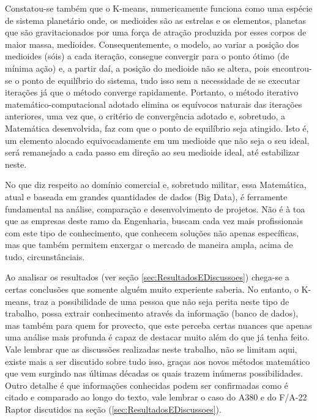 \documentclass[12pt]{article} %
\begin{document}
	Constatou-se também que o K-means, numericamente funciona como uma espécie de sistema planetário onde, os medioides são as estrelas e os elementos, planetas que são gravitacionados por uma força de atração produzida por esses corpos de maior massa, medioides. Consequentemente, o modelo, ao variar a posição dos medioides (sóis) a cada iteração, consegue convergir para o ponto ótimo (de mínima ação) e, a partir daí, a posição do medioide não se altera, pois encontrou-se o ponto de equilíbrio do sistema, tudo isso sem a necessidade de se executar  iterações já que o método converge rapidamente. Portanto, o método iterativo matemático-computacional adotado elimina os equívocos naturais das iterações anteriores, uma vez que, o critério de convergência adotado e, sobretudo, a Matemática desenvolvida, faz com que o ponto de equilíbrio seja atingido. Isto é, um elemento alocado equivocadamente em um medioide que não seja o seu ideal, será remanejado a cada passo em direção ao seu medioide ideal, até estabilizar neste.
	
	No que diz respeito ao domínio comercial e, sobretudo militar, essa Matemática, atual e baseada em grandes quantidades de dados (Big Data), é ferramente fundamental na análise, comparação e desenvolvimento de projetos. Não é à toa que as empresas deste ramo da Engenharia, buscam cada vez mais profissionais com este tipo de conhecimento, que conhecem soluções não apenas específicas, mas que também permitem enxergar o mercado de maneira ampla, acima de tudo, circunstânciais. 
	
	Ao analisar os resultados (ver seção \ref{sec:ResultadosEDiscussoes}) chega-se a certas conclusões que somente alguém muito experiente saberia. No entanto, o K-means, traz a possibilidade de uma pessoa que não seja perita neste tipo de trabalho, possa extrair conhecimento através da informação (banco de dados), mas também para quem for provecto, que este perceba certas nuances que apenas uma análise mais profunda é capaz de destacar muito além do que  já tenha feito. Vale lembrar que as discussões realizadas neste trabalho, não se limitam aqui, existe mais a ser discutido sobre tudo isso, graças aos novos métodos matemático que vem surgindo nas últimas décadas os quais trazem inúmeras possibilidades. Outro detalhe é que informações conhecidas podem ser confirmadas como é citado e comparado ao longo do texto, vale lembrar o caso do A380 e do F/A-22 Raptor discutidos na seção (\ref{sec:ResultadosEDiscussoes}).
	
\end{document}
